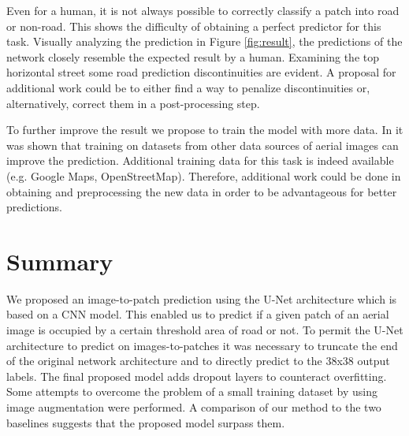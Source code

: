 \documentclass[10pt,conference,compsocconf]{IEEEtran}
\begin{document}
Even for a human, it is not always possible to correctly classify a patch into road or non-road. This shows the difficulty of obtaining a perfect predictor for this task. Visually analyzing the prediction in Figure \ref{fig:result}, the predictions of the network closely resemble the expected result by a human. Examining the top horizontal street some road prediction discontinuities are evident. A proposal for additional work could be to either find a way to penalize discontinuities or, alternatively, correct them in a post-processing step.

To further improve the result we propose to train the model with more data. In \cite{Kaiser2017} it was shown that training on datasets from other data sources of aerial images can improve the prediction. Additional training data for this task is indeed available (e.g. Google Maps, OpenStreetMap). Therefore, additional work could be done in obtaining and preprocessing the new data in order to be advantageous for better predictions.

\section{Summary}

We proposed an image-to-patch prediction using the U-Net architecture which is based on a CNN model. This enabled us to predict if a given patch of an aerial image is occupied by a certain threshold area of road or not. To permit the U-Net architecture to predict on images-to-patches it was necessary to truncate the end of the original network architecture and to directly predict to the 38x38 output labels. The final proposed model adds dropout layers to counteract overfitting. Some attempts to overcome the problem of a small training dataset by using image augmentation were performed. A comparison of our method to the two baselines suggests that the proposed model surpass them.





\end{document}
